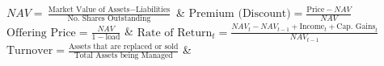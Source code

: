 $NAV = \frac{\text{Market Value of Assets} - \text{Liabilities}}{\text{No. Shares Outstanding}}$ & $\text{Premium (Discount)} = \frac{\text{Price} - NAV}{NAV}$ \\

$\text{Offering Price} = \frac{NAV}{1 - \text{load}}$ & $\text{Rate of Return}_{t} = \frac{NAV_{t} - NAV_{t-1} + \text{Income}_{t} + \text{Cap. Gains}_{t}}{NAV_{t-1}}$ \\

$\text{Turnover} = \frac{\text{Assets that are replaced or sold}}{\text{Total Assets being Managed}}$ & \\
